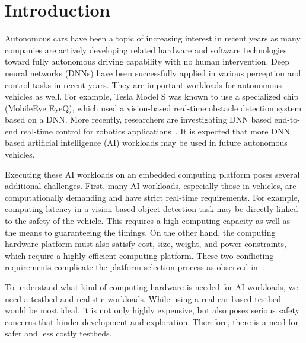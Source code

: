 \section{Introduction} \label{sec:intro}

%
%
Autonomous cars have been a topic of increasing interest in recent
years as many companies are actively developing related hardware
and software technologies toward fully autonomous driving capability with
no human intervention. Deep neural networks (DNNs) have been
successfully applied in various perception and control tasks in
recent years.  They are important workloads for autonomous vehicles
as well. For example, Tesla Model S was known to use a specialized
chip (MobileEye EyeQ), which used a vision-based real-time obstacle
detection system based on a DNN. More recently, researchers 
are investigating DNN based end-to-end real-time control for
robotics applications~\cite{Bojarski2016,Levine2016}. It is expected
that more DNN based artificial intelligence (AI) workloads may be
used in future autonomous vehicles.

Executing these AI workloads on an embedded computing platform 
poses several additional challenges. First, many AI workloads,
especially those in vehicles, are computationally demanding and have
strict real-time requirements.
For example, computing latency in a vision-based object
detection task may be directly linked to the safety of the vehicle. This
requires a high computing capacity as well as the means to guaranteeing
the timings. On the other hand, the computing hardware platform must
also satisfy cost, size, weight, and power constraints, which require a
highly efficient computing platform. These two conflicting
requirements complicate the platform selection process as observed 
in~\cite{Otterness2017}.


To understand what kind of computing hardware is needed for AI
workloads, we need a testbed and realistic workloads. While using a
real car-based testbed would be most ideal, it is not only highly
expensive, but also poses serious safety concerns that hinder
development and exploration. Therefore, there is a need for safer and
less costly testbeds.

